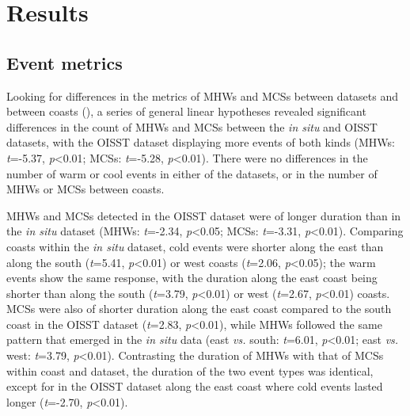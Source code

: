 \documentclass[a4paper,10pt,review]{elsarticle}
\begin{document}
\section{Results}

\subsection{Event metrics}
Looking for differences in the metrics of MHWs and MCSs between datasets and between coasts (), a series of general linear hypotheses \citep{Hothorn2008} revealed significant differences in the count of MHWs and MCSs between the \emph{in situ} and OISST datasets, with the OISST dataset displaying more events of both kinds (MHWs: \emph{t}=-5.37, \emph{p}<0.01; MCSs: \emph{t}=-5.28, \emph{p}<0.01). There were no differences in the number of warm or cool events in either of the datasets, or in the number of MHWs or MCSs between coasts.

MHWs and MCSs detected in the OISST dataset were of longer duration than in the \emph{in situ} dataset (MHWs: \emph{t}=-2.34, \emph{p}<0.05; MCSs: \emph{t}=-3.31, \emph{p}<0.01). Comparing coasts within the \emph{in situ} dataset, cold events were shorter along the east than along the south (\emph{t}=5.41, \emph{p}<0.01) or west coasts (\emph{t}=2.06, \emph{p}<0.05); the warm events show the same response, with the duration along the east coast being shorter than along the south (\emph{t}=3.79, \emph{p}<0.01) or west (\emph{t}=2.67, \emph{p}<0.01) coasts. MCSs were also of shorter duration along the east coast compared to the south coast in the OISST dataset (\emph{t}=2.83, \emph{p}<0.01), while MHWs followed the same pattern that emerged in the \emph{in situ} data (east \emph{vs.} south: \emph{t}=6.01, \emph{p}<0.01; east \emph{vs.} west: \emph{t}=3.79, \emph{p}<0.01). Contrasting the duration of MHWs with that of MCSs within coast and dataset, the duration of the two event types was identical, except for in the OISST dataset along the east coast where cold events lasted longer (\emph{t}=-2.70, \emph{p}<0.01).
\end{document}
